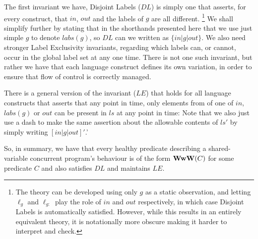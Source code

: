The first invariant we have, Disjoint Labels ($DL$) is simply one that asserts,
for every construct, that $in$, $out$ and the labels of $g$
are all different.
\footnote{The theory can be developed using only $g$ as a static observation,
and letting $\ell_g$ and $\ell_{g:}$ play the role of $in$ and $out$
respectively, in which case Disjoint Labels is automatically satisfied.
However, while this results in an entirely equivalent theory,
it is notationally more obscure
making it harder to interpret and check.
}%
We shall simplify further by stating that in the shorthands presented
here that we use just simple $g$ to denote $labs(g)$,
so $DL$ can we written as $\{in|g|out\}$.
We also need stronger Label Exclusivity invariants,
regarding which labels can, or cannot,
occur in the global label set at any one time.
There is not one such invariant,
but rather we have that each language construct defines its own
variation, in order to ensure that flow of control is correctly managed.

There is a general version of the invariant ($LE$) that holds
for all language constructs that asserts that any point in time,
only elements from of one of $in$, $labs(g)$ or $out$
can be present in $ls$ at any point in time:
Note that we also just use a dash to make
the same assertion about the allowable contents of $ls'$
by simply writing $[in|g|out]'$.'

So, in summary, we have that every healthy predicate describing
a shared-variable concurrent program's behaviour is of the form $\mathbf{WwW}(C)$
for some predicate $C$ and also satisfies $DL$ and maintains $LE$.
